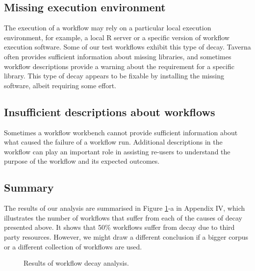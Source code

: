 \subsection{Missing execution environment}
The execution of a workflow may rely on a particular local execution environment, for example, a local R server or a specific version of workflow execution software. Some of our test workflows exhibit this type of decay. Taverna often provides sufficient information about missing libraries, and sometimes workflow descriptions provide a warning about the requirement for a specific library. This type of decay appears to be fixable by installing the missing software, albeit requiring some effort.

\subsection{Insufficient descriptions about workflows}
Sometimes a workflow workbench cannot provide sufficient information about what caused the failure of a workflow run. Additional descriptions in the workflow can play an important role in assisting re-users to understand the purpose of the workflow and its expected outcomes.




\subsection{Summary}
The results of our analysis are summarised in Figure \ref{fig:decay-analysis}-a in Appendix IV, which illustrates the number of workflows that suffer from each of the causes of decay presented above. It shows that {50\%} workflows suffer from decay due to third party resources. However, we might draw a different conclusion if a bigger corpus or a different collection of workflows are used.

\begin{figure}[ht]
\centering
{}
\caption{Results of workflow decay analysis.}
\label{fig:decay-analysis}
\end{figure}


